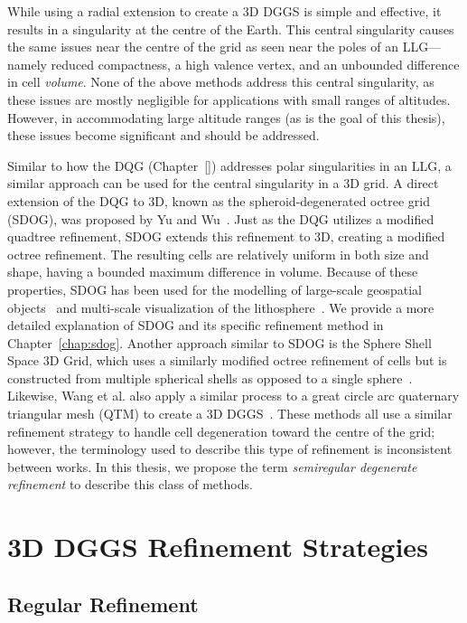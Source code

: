 While using a radial extension to create a 3D DGGS is simple and effective, it results in a singularity at the centre of the Earth.
This central singularity causes the same issues near the centre of the grid as seen near the poles of an LLG---namely reduced compactness, a high valence vertex, and an unbounded difference in cell \textit{volume}.
None of the above methods address this central singularity, as these issues are mostly negligible for applications with small ranges of altitudes.
However, in accommodating large altitude ranges (as is the goal of this thesis), these issues become significant and should be addressed.


Similar to how the DQG (Chapter~\ref{}) addresses polar singularities in an LLG, a similar approach can be used for the central singularity in a 3D grid.
A direct extension of the DQG to 3D, known as the spheroid-degenerated octree grid (SDOG), was proposed by Yu and Wu~\cite{yu2009sdog}.
Just as the DQG utilizes a modified quadtree refinement, SDOG extends this refinement to 3D, creating a modified octree refinement.
The resulting cells are relatively uniform in both size and shape, having a bounded maximum difference in volume.
Because of these properties, SDOG has been used for the modelling of large-scale geospatial objects~\cite{yu2012large-scale} and multi-scale visualization of the lithosphere~\cite{yu2012lithosphere}.
We provide a more detailed explanation of SDOG and its specific refinement method in Chapter~\ref{chap:sdog}.
Another approach similar to SDOG is the Sphere Shell Space 3D Grid, which uses a similarly modified octree refinement of cells but is constructed from multiple spherical shells as opposed to a single sphere~\cite{gang2013sphere}.
Likewise, Wang et al. also apply a similar process to a great circle arc quaternary triangular mesh (QTM) to create a 3D DGGS~\cite{wang2013global}.
These methods all use a similar refinement strategy to handle cell degeneration toward the centre of the grid; however, the terminology used to describe this type of refinement is inconsistent between works.
In this thesis, we propose the term \textit{semiregular degenerate refinement} to describe this class of methods.

\section{3D DGGS Refinement Strategies} \label{chap:3:refinement}

\subsection{Regular Refinement} \label{chap:3:regular}

